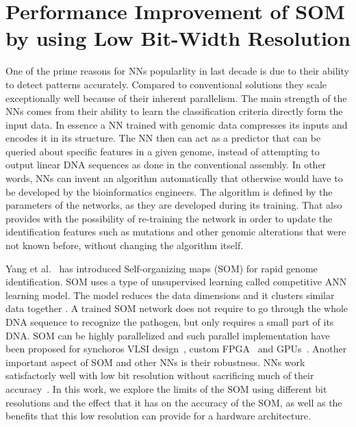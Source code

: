 \graphicspath{{./Ch5-SOM/images/}}

\chapter{Performance Improvement of SOM by using Low Bit-Width Resolution} \label{chap:SOM}
One of the prime reasons for NNs popularlity in last decade is due to their ability to detect patterns accurately. Compared to conventional solutions they scale exceptionally well because of their inherent parallelism. The main strength of the NNs comes from their ability to learn the classification criteria directly form the input data. In essence a NN trained with genomic data compresses its inputs and encodes it in its structure. The NN then can act as a predictor that can be queried about specific features in a given genome, instead of attempting to output linear DNA sequences as done in the conventional assembly. In other words, NNs can invent an algorithm automatically that otherwise would have to be developed by the bioinformatics engineers. The algorithm is defined by the parameters of the networks, as they are developed during its training. That also provides with the possibility of re-training the network in order to update the identification features such as mutations and other genomic alterations that were not known before, without changing the algorithm itself.

Yang et al.~\cite{Yang2018RiBoSOM} has introduced Self-organizing maps (SOM) for rapid genome identification. SOM uses a type of unsupervised learning called competitive ANN learning model. The model reduces the data dimensions and it clusters similar data together \cite{Kohonen2013}. A trained SOM network does not require to go through the whole DNA sequence to recognize the pathogen, but only requires a small part of its DNA. SOM can be highly parallelized and such parallel implementation have been proposed for synchoros VLSI design~\cite{Yang2018RiBoSOM}, custom FPGA~\cite{Porrmann2006} and GPUs~\cite{McConnell2012}. Another important aspect of SOM and other NNs is their robustness. NNs work satisfactorly well with low bit resolution without sacrificing much of their accuracy~\cite{8056820}. In this work, we explore the limits of the SOM using different bit resolutions and the effect that it has on the accuracy of the SOM, as well as the benefits that this low resolution can provide for a hardware architecture. 

